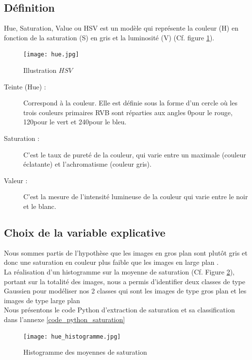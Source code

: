 \documentclass{book}
\begin{document}
\subsection{Définition}
Hue, Saturation, Value ou HSV est un modèle qui représente la couleur (H) en fonction de la saturation (S) en gris et la luminosité (V) (Cf. figure \ref{HSV}).
\begin{figure}[H]
\begin{center}
\texttt{[image: hue.jpg]}
\end{center}
\caption{Illustration $HSV$ \cite{wiki:hsv}}
\label{HSV}
\end{figure}
\begin{description}
\item[Teinte (Hue) :] Correspond à la couleur. Elle est définie sous la forme
d'un cercle où les trois couleurs primaires RVB sont
réparties aux angles 0\degre pour le rouge, 120\degre pour le vert
et 240\degre pour le bleu.
\item[Saturation :] C’est le taux de pureté de la couleur, qui varie entre un
maximale (couleur éclatante) et l’achromatisme (couleur
gris).
\item[Valeur :]  C’est la mesure de l’intensité lumineuse de la couleur
qui varie entre le noir et le blanc.
\end{description}

\subsection{Choix de la variable explicative}

Nous sommes partis de l’hypothèse que les images en \og gros plan \fg{} sont plutôt gris et donc une saturation en couleur plus faible que les images en \og large plan \fg{}.\\
La réalisation d’un histogramme sur la moyenne de saturation (Cf. Figure \ref{hue_histo}), portant sur la totalité des images, nous a permis d’identifier deux classes de type Gaussien pour modéliser nos 2 classes
qui sont les images de type \og gros plan \fg{} et les images de type \og large plan \fg{}\\
Nous présentons le code Python d'extraction de saturation et sa classification dans l'annexe \ref{code_python_saturation}
\label{hue_frontiere}
\begin{figure}[H]
\begin{center}
\texttt{[image: hue\_histogramme.jpg]}
\end{center}
\caption{Histogramme des moyennes de saturation}
\label{hue_histo}
\end{figure}
\end{document}
